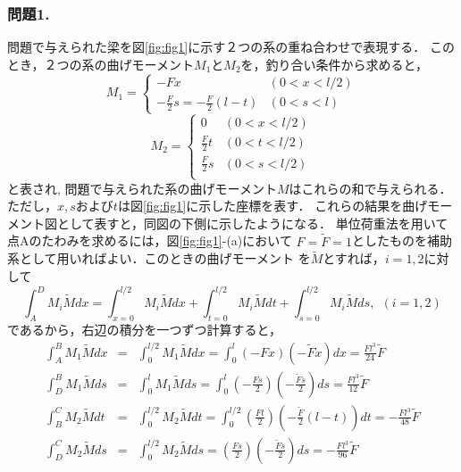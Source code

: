 \documentclass[10pt,a4j]{jarticle}
\begin{document}
\subsubsection*{問題1.}
問題で与えられた梁を図\ref{fig:fig1}に示す２つの系の重ね合わせで表現する．
このとき，２つの系の曲げモーメント$M_1$と$M_2$を，釣り合い条件から求めると，
\begin{equation}
	M_1=\left\{
	\begin{array}{ll}
		-Fx & (0< x < l/2) \\ 
		-\frac{F}{2}s=-\frac{F}{2}(l-t)& (0< s < l)
	\end{array}
	\right.
\end{equation}
\begin{equation}
	M_2=\left\{
	\begin{array}{ll}
		0 & (0< x < l/2) \\ 
		\frac{F}{2}t & (0< t < l/2) \\ 
		\frac{F}{2}s & (0< s < l/2) \\ 
	\end{array}
	\right.
\end{equation}
と表され, 問題で与えられた系の曲げモーメント$M$はこれらの和で与えられる．
ただし，$x,s$および$t$は図\ref{fig:fig1}に示した座標を表す．
これらの結果を曲げモーメント図として表すと，同図の下側に示したようになる．
単位荷重法を用いて点Aのたわみを求めるには，図\ref{fig:fig1}-(a)において
$F=\tilde F=1$としたものを補助系として用いればよい．このときの曲げモーメント
を$\tilde M$とすれば，$i=1,2$に対して
\begin{equation}
	\int_A^D M_i\tilde M dx
	=
	\int_{x=0}^{l/2}M_i \tilde M dx
	+
	\int_{t=0}^{l/2}M_i \tilde M dt
	+
	\int_{s=0}^{l/2}M_i \tilde M ds, \ \ (i=1,2)
\end{equation}
であるから，右辺の積分を一つずつ計算すると，
\begin{eqnarray}
	\int_A^B M_1\tilde Mdx 
	&=& 
	\int_0^{l/2}M_1\tilde Mdx 
	=
	\int_0^l (-Fx)(-\tilde Fx)dx
	=\frac{Fl^3}{24}\tilde F \\
	\int_D^B M_1\tilde M ds 
	&=& 
	\int_0^{l}M_1\tilde Mds 
	= 
	\int_0^l 
	\left(-\frac{Fs}{2} \right) \left(-\frac{\tilde Fs}{2} \right)ds
	=
	\frac{Fl^3}{12}\tilde F \\
	\int_B^C M_2\tilde M dt 
	&=& 
	\int_0^{l/2}M_2\tilde Mdt 
	= 
	\int_0^{l/2}
	\left(\frac{Ft}{2} \right) \left(-\frac{\tilde F}{2}(l-t) \right)dt
	=-\frac{Fl^3}{48}\tilde F \\
	\int_D^C M_2\tilde M ds
	&=&
	\int_0^{l/2}M_2\tilde Mds 
	= 
	\left(\frac{Fs}{2} \right) \left(-\frac{\tilde Fs}{2} \right) ds
	=-\frac{Fl^3}{96}\tilde F 
\end{eqnarray}
\end{document}
